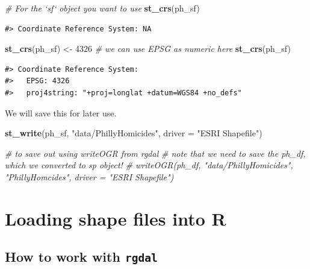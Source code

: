\documentclass[]{book}
\newenvironment{Shaded}{\begin{snugshade}}{\end{snugshade}}
\newcommand{\KeywordTok}[1]{\textcolor[rgb]{0.13,0.29,0.53}{\textbf{#1}}}
\newcommand{\DataTypeTok}[1]{\textcolor[rgb]{0.13,0.29,0.53}{#1}}
\newcommand{\DecValTok}[1]{\textcolor[rgb]{0.00,0.00,0.81}{#1}}
\newcommand{\StringTok}[1]{\textcolor[rgb]{0.31,0.60,0.02}{#1}}
\newcommand{\CommentTok}[1]{\textcolor[rgb]{0.56,0.35,0.01}{\textit{#1}}}
\newcommand{\NormalTok}[1]{#1}
\theoremstyle{definition}
\theoremstyle{definition}
\theoremstyle{definition}
\theoremstyle{remark}
\begin{document}
\begin{Shaded}
\begin{Highlighting}[]
\CommentTok{# For the `sf` object you want to use }
\KeywordTok{st_crs}\NormalTok{(ph_sf)}
\end{Highlighting}
\end{Shaded}

\begin{verbatim}
#> Coordinate Reference System: NA
\end{verbatim}

\begin{Shaded}
\begin{Highlighting}[]
\KeywordTok{st_crs}\NormalTok{(ph_sf) <-}\StringTok{ }\DecValTok{4326} \CommentTok{# we can use EPSG as numeric here}
\KeywordTok{st_crs}\NormalTok{(ph_sf)}
\end{Highlighting}
\end{Shaded}

\begin{verbatim}
#> Coordinate Reference System:
#>   EPSG: 4326 
#>   proj4string: "+proj=longlat +datum=WGS84 +no_defs"
\end{verbatim}

We will save this for later use.

\begin{Shaded}
\begin{Highlighting}[]
\KeywordTok{st_write}\NormalTok{(ph_sf, }\StringTok{"data/PhillyHomicides"}\NormalTok{, }\DataTypeTok{driver =} \StringTok{"ESRI Shapefile"}\NormalTok{)}

\CommentTok{# to save out using writeOGR from rgdal}
\CommentTok{# note that we need to save the ph_df, which we converted to sp object!}
\CommentTok{# writeOGR(ph_df, "data/PhillyHomicides", "PhillyHomcides", driver = "ESRI Shapefile")}
\end{Highlighting}
\end{Shaded}

\section{Loading shape files into R}\label{loading-shape-files-into-r}

\subsection{\texorpdfstring{How to work with
\texttt{rgdal}}{How to work with rgdal}}\label{how-to-work-with-rgdal}
\end{document}
